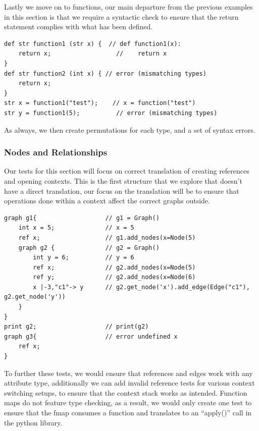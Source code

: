 Lastly we move on to functions, our main departure from the previous examples in this section is that we require a
syntactic check to ensure that the return statement complies with what has been defined.

\begin{lstlisting}[caption={Testing functions},captionpos=b, label={lst:lattice-function-test}]
def str function1 (str x) {  // def function1(x):
    return x;                  //    return x
}
def str function2 (int x) { // error (mismatching types)
    return x;
}
str x = function1("test");    // x = function("test")
str y = function1(5);          // error (mismatching types)
\end{lstlisting}

As always, we then create permutations for each type, and a set of syntax errors.

\subsubsection{Nodes and Relationships}
Our tests for this section will focus on correct translation of creating references and opening contexts.
This is the first structure that we explore that doesn't have a direct translation, our focus on the translation will
be to ensure that operations done within a context affect the correct graphs outside.

\begin{lstlisting}[caption={Testing graphs},captionpos=b, label={lst:lattice-graph-test}]
graph g1{                   // g1 = Graph()
    int x = 5;              // x = 5
    ref x;                  // g1.add_nodes(x=Node(5)
    graph g2 {              // g2 = Graph()
        int y = 6;          // y = 6
        ref x;              // g2.add_nodes(x=Node(5)
        ref y;              // g2.add_nodes(x=Node(6)
        x |-3,"c1"-> y      // g2.get_node('x').add_edge(Edge("c1"), g2.get_node('y'))
    }
}
print g2;                   // print(g2)
graph g3{                   // error undefined x
    ref x;
}
\end{lstlisting}

To further these tests, we would ensure that references and edges work with any attribute type, additionally we can
add invalid reference tests for various context switching setups, to ensure that the context stack works as intended.
Function maps do not feature type checking, as a result, we would only create one test to ensure that the fmap consumes
a function and translates to an ``apply()'' call in the python library.


